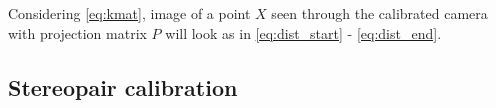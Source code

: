 Considering \autoref{eq:kmat}, image of a point $X$ seen through the calibrated camera with projection matrix $P$ will look as in \autoref{eq:dist_start} - \autoref{eq:dist_end}.

\subsection{Stereopair calibration}

